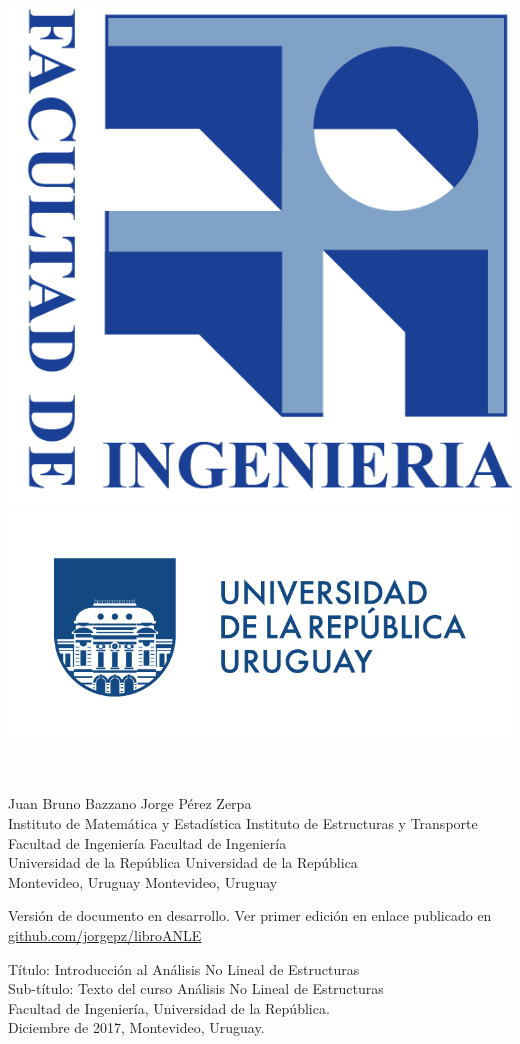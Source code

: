 \documentclass[spanish,twoside,openright,10pt]{book}
\theoremstyle{miestilo}
\begin{document}
\begin{titlepage}
\vfill

\noindent
\begin{center}
	\hfill
	\includegraphics[height=0.12\textwidth]{logofing}
\qquad	
	\includegraphics[height=0.15\textwidth]{logoudelar}    
\end{center}

\end{titlepage}

%


~
\vspace{5mm}
\singlespacing


  \noindent
{\sffamily Juan Bruno Bazzano \hfill Jorge Pérez Zerpa\\
	{\footnotesize 	Instituto de Matemática y Estadística  \hfill Instituto de Estructuras y Transporte\\
		Facultad de Ingeniería \hfill Facultad de Ingeniería\\
		Universidad de la República \hfill Universidad de la República\\
		Montevideo, Uruguay \hfill Montevideo, Uruguay}}\\[0.5cm]


\vspace{25mm}

\noindent
Versión de documento en desarrollo. Ver primer edición en enlace publicado en
\href{https://github.com/jorgepz/libroANLE}{github.com/jorgepz/libroANLE}

\noindent
Título: Introducción al Análisis No Lineal de Estructuras\\
\noindent
Sub-título: Texto del curso Análisis No Lineal de Estructuras\\[-2mm]

\noindent
Facultad de Ingeniería, Universidad de la República.\\
Diciembre de 2017, Montevideo, Uruguay.\\[-2mm]

\end{document}
